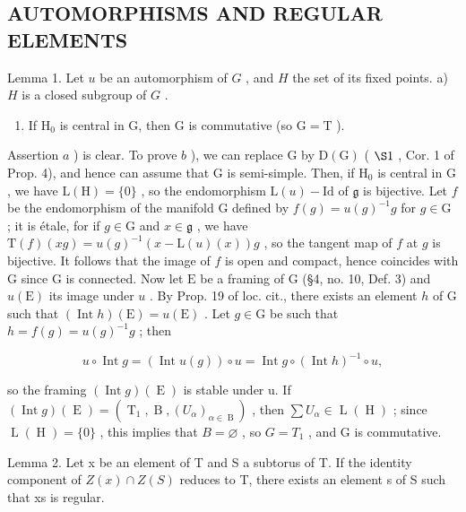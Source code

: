 \subsection{AUTOMORPHISMS AND REGULAR ELEMENTS}

Lemma 1. Let \(u\) be an automorphism of \(G\) , and \(H\) the set of its fixed points. a) \(H\) is a closed subgroup of \(G\) .

\begin{enumerate}
\def\labelenumi{\alph{enumi})}
\setcounter{enumi}{1}
\tightlist
\item
  If \(\mathrm{H}_0\) is central in G, then G is commutative (so \(\mathrm{G} = \mathrm{T}\) ).
\end{enumerate}

Assertion \(a\) ) is clear. To prove \(b\) ), we can replace \(\mathrm{G}\) by \(\mathrm{D}(\mathrm{G})\) ( \(\S 1\) , Cor. 1 of Prop. 4), and hence can assume that \(\mathrm{G}\) is semi-simple. Then, if \(\mathrm{H}_0\) is central in \(\mathrm{G}\) , we have \(\mathrm{L}(\mathrm{H}) = \{0\}\) , so the endomorphism \(\mathrm{L}(u) - \mathrm{Id}\) of \(\mathfrak{g}\) is bijective. Let \(f\) be the endomorphism of the manifold \(\mathrm{G}\) defined by \(f(g) = u(g)^{-1}g\) for \(g \in \mathrm{G}\) ; it is étale, for if \(g \in \mathrm{G}\) and \(x \in \mathfrak{g}\) , we have \(\mathrm{T}(f)(xg) = u(g)^{-1}(x - \mathrm{L}(u)(x))g\) , so the tangent map of \(f\) at \(g\) is bijective. It follows that the image of \(f\) is open and compact, hence coincides with \(\mathrm{G}\) since \(\mathrm{G}\) is connected. Now let \(\mathrm{E}\) be a framing of G (§4, no. 10, Def. 3) and \(u(\mathrm{E})\) its image under \(u\) . By Prop. 19 of loc. cit., there exists an element \(h\) of G such that \((\operatorname{Int} h)(\mathrm{E}) = u(\mathrm{E})\) . Let \(g \in \mathrm{G}\) be such that \(h = f(g) = u(g)^{-1}g\) ; then

\[
u \circ \operatorname{Int} g = (\operatorname{Int} u (g)) \circ u = \operatorname{Int} g \circ (\operatorname{Int} h) ^ {- 1} \circ u,
\]

so the framing \((\operatorname{Int} g)(\operatorname{E})\) is stable under u. If \((\operatorname{Int} g)(\operatorname{E}) = (\operatorname{T}_{1}, \operatorname{B}, (U_{\alpha})_{\alpha \in \operatorname{B}})\) , then \(\sum U_{\alpha} \in \operatorname{L}(\operatorname{H})\) ; since \(\operatorname{L}(\operatorname{H}) = \{0\}\) , this implies that \(B = \varnothing\) , so \(G = T_{1}\) , and G is commutative.

Lemma 2. Let x be an element of T and S a subtorus of T. If the identity component of \(Z(x) \cap Z(S)\) reduces to T, there exists an element s of S such that xs is regular.

